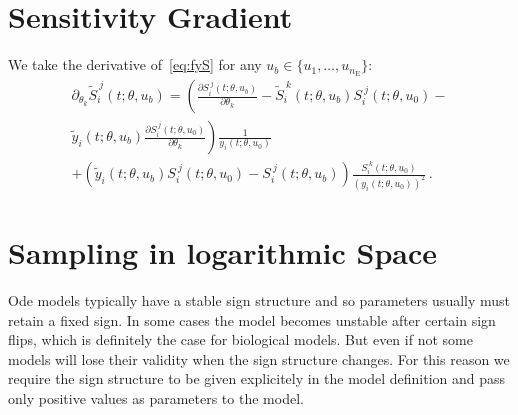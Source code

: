 \documentclass[utf8,english]{scrartcl}
\begin{document}
\section{Sensitivity Gradient}
\label{sec:dS}

We take the derivative of~\eqref{eq:fyS} for any $u_b\in\{u_1,\dots,u_{n_{\text{E}}}\}$:
\begin{multline}
  \partial_{\theta_k} \tilde S_i^{~j}(t;\theta,u_b)
  =\left(\frac{\partial S_i^{~j}(t;\theta,u_b)}{\partial\theta_k} -\right.
    \tilde S_i^{~k}(t;\theta,u_b)S_i^{~j}(t;\theta,u_0) -\\ 
    \left.\tilde y_i(t;\theta,u_b)\frac{\partial S_i^{~j}(t;\theta,u_0)}{\partial
      \theta_k}\right) \frac{1}{y_i(t;\theta,u_0)}\\
  +\left(\tilde y_i(t;\theta,u_b) S_i^{~j}(t;\theta,u_0) - S_i^{~j}(t;\theta,u_b)\right)\frac{S_i^{~k}(t;\theta,u_0)}{(y_i(t;\theta,u_0))^2}\label{eq:dfyS}\,.
\end{multline}

\section{Sampling in logarithmic Space}
\label{sec:rho}

Ode models typically have a stable sign structure and so parameters
usually must retain a fixed sign. In some cases the model becomes
unstable after certain sign flips, which is definitely the case for
biological models. But even if not some models will lose their
validity when the sign structure changes. For this reason we require
the sign structure to be given explicitely in the model definition and
pass only positive values as parameters to the model.
\end{document}
